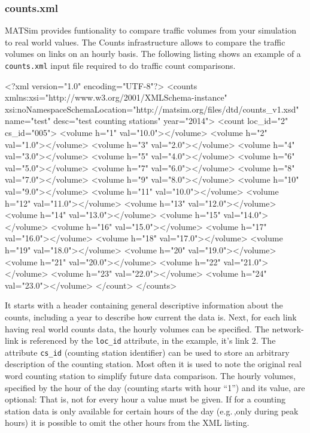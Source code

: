 \subsubsection{counts.xml}
MATSim provides funtionality to compare traffic volumes from your simulation to real world values. The Counts infrastructure allows to compare the traffic volumes on links on an hourly basis. The following listing shows an example of a \lstinline|counts.xml| input file required to do traffic count comparisons. 

\begin{xml}
<?xml version="1.0" encoding="UTF-8"?> 
<counts xmlns:xsi="http://www.w3.org/2001/XMLSchema-instance" 
        xsi:noNamespaceSchemaLocation="http://matsim.org/files/dtd/counts_v1.xsd" 
        name="test" desc="test counting stations" year="2014"> 
   <count loc_id="2" cs_id="005"> 
      <volume h="1" val="10.0"></volume> 
      <volume h="2" val="1.0"></volume> 
      <volume h="3" val="2.0"></volume> 
      <volume h="4" val="3.0"></volume> 
      <volume h="5" val="4.0"></volume> 
      <volume h="6" val="5.0"></volume> 
      <volume h="7" val="6.0"></volume> 
      <volume h="8" val="7.0"></volume> 
      <volume h="9" val="8.0"></volume> 
      <volume h="10" val="9.0"></volume> 
      <volume h="11" val="10.0"></volume> 
      <volume h="12" val="11.0"></volume> 
      <volume h="13" val="12.0"></volume> 
      <volume h="14" val="13.0"></volume> 
      <volume h="15" val="14.0"></volume> 
      <volume h="16" val="15.0"></volume> 
      <volume h="17" val="16.0"></volume> 
      <volume h="18" val="17.0"></volume> 
      <volume h="19" val="18.0"></volume> 
      <volume h="20" val="19.0"></volume> 
      <volume h="21" val="20.0"></volume> 
      <volume h="22" val="21.0"></volume> 
      <volume h="23" val="22.0"></volume> 
      <volume h="24" val="23.0"></volume> 
   </count> 
</counts>
\end{xml}

It starts with a header containing general descriptive information about the counts, including a year to describe how current the data is. Next, for each link having real world counts data, the hourly volumes can be specified. The network-link is referenced by the \lstinline|loc_id| attribute, in the example, it's link 2. The attribute \lstinline|cs_id| (counting station identifier) can be used to store an arbitrary description of the counting station. Most often it is used to note the original real word counting station to simplify future data comparison. The hourly volumes, specified by the hour of the day (counting starts with hour ``1'') and its value, are optional: That is, not for every hour a value must be given. If for a counting station data is only available for certain hours of the day (e.g.\,,only during peak hours) it is possible to omit the other hours from the XML listing. 

